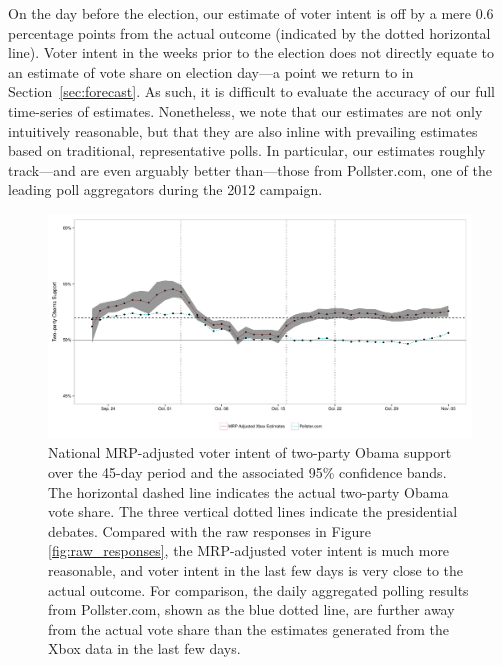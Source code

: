 \documentclass[preprint,authoryear,12pt]{elsarticle}
\begin{document}
On the day before the election, our estimate of voter intent  is off by a mere 0.6
percentage points from the actual outcome (indicated by the dotted horizontal
line).  Voter intent in the weeks prior to the election does not directly equate
to an estimate of vote share on election day---a point we return to in
Section~\ref{sec:forecast}. As such, it is difficult to evaluate the accuracy of
our full time-series of estimates.  Nonetheless, we note that our estimates are
not only intuitively reasonable, but that they are also inline with prevailing
estimates based on traditional, representative polls. In particular, our
estimates roughly track---and are even arguably better than---those from Pollster.com, one of the leading poll aggregators during the 2012
campaign.


\begin{figure}
  \centering
  \includegraphics[width=.8\textwidth]{mrp_snapshots_national}
  \caption{National MRP-adjusted voter intent of two-party Obama support over
    the 45-day period and the associated 95\% confidence bands. The horizontal
    dashed line indicates the actual two-party Obama vote share. The three
    vertical dotted lines indicate the presidential debates. Compared with the raw
    responses in Figure \ref{fig:raw_responses}, the MRP-adjusted voter intent
    is much more reasonable, and voter intent in the last few days is very
    close to the actual outcome. For comparison, the daily aggregated polling
    results from Pollster.com, shown as the blue dotted line, are further away from the actual vote share
    than the estimates generated from the Xbox data in the last few days.}
  \label{fig:national_snap}
\end{figure}
\end{document}
